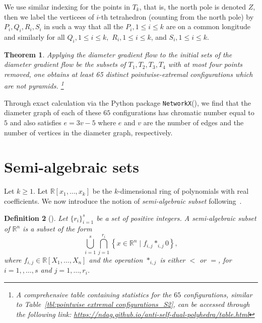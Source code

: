 \documentclass[12pt]{amsart}
\theoremstyle{plain}
\newtheorem{theorem}{Theorem}[section]
\newtheorem{definition}[theorem]{Definition}
\newcommand{\R}{\mathbb{R}}
\numberwithin{equation}{section}
\begin{document}
We use similar indexing for the points in $T_k$, that is, the north
pole is denoted $Z$, then we label the verticees of $i$-th tetrahedron
(counting from the north pole) by $P_i, Q_i, R_i, S_i$ in such a way
that all the $P_i, 1\leq i\leq k$ are on a common longitude and
similarly for all $Q_i, 1\leq i\leq k,$ $R_i, 1\leq i\leq k$, and
$S_i, 1\leq i\leq k$.


\begin{theorem}
\label{t61}
Applying the diameter gradient flow to the initial sets of the
diameter gradient flow be the subsets of $T_1, T_2, T_3, T_4$ with at
most four points removed, one obtains at least 65 distinct
pointwise-extremal configurations which are not pyramids. \footnote{A comprehensive table containing statistics for the $65$ configurations, similar to Table~\ref{tbl:pointwise extremal configurations_S2}, can be accessed through the following link: \url{https://ndag.github.io/anti-self-dual-polyhedra/table.html}}
\end{theorem}

 

Through exact calculation via the Python package
\texttt{NetworkX}(\cite{hagberg2008exploring}), we find that the
diameter graph of each of these $65$ configurations has chromatic
number equal to $5$ and also satisfies $e = 3v -5$ where $e$ and $v$
are the number of edges and the number of vertices in the diameter
graph, respectively.



\appendix
\section{Semi-algebraic sets}
\label{s7}

Let $k\geq1$.  Let $\R[x_1, \dots, x_k]$ be the $k$-dimensional ring
of polynomials with real coefficients.  We now introduce the notion of
\emph{semi-algebraic subset} following~\cite{bochnak2013real}.

\begin{definition}[{\cite[Definition~2.1.4]{bochnak2013real}}]\label{defn:semi_alg_set}
Let 
 $\{r_i\}_{i=1}^s$ be a set of positive integers.
A \emph{semi-algebraic subset} of $\R^{n}$ is a subset of the form
$$
\bigcup_{i=1}^{s} \bigcap_{j=1}^{r_{i}}\left\{x \in \R^{n} \mid f_{i, j} *_{i, j} 0\right\},
$$
where $f_{i, j} \in \R\left[X_{1}, \ldots, X_{n}\right]$ and the operation $*_{i, j}$ is either $<$ or $=$, for $i=1,, \ldots, s$ and $j=1, \ldots, r_{i}$.
\end{definition}
\end{document}
